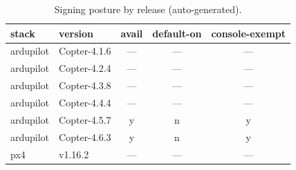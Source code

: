 \begin{table}[t]
\caption{Signing posture by release (auto-generated).}
\label{tab:long}
\centering\footnotesize
\begin{tabular}{@{}llccc@{}}
\toprule
stack & version & avail & default-on & console-exempt \\
\midrule
ardupilot & Copter-4.1.6 & — & — & — \\
ardupilot & Copter-4.2.4 & — & — & — \\
ardupilot & Copter-4.3.8 & — & — & — \\
ardupilot & Copter-4.4.4 & — & — & — \\
ardupilot & Copter-4.5.7 & y & n & y \\
ardupilot & Copter-4.6.3 & y & n & y \\
px4 & v1.16.2 & — & — & — \\
\bottomrule
\end{tabular}
\end{table}
